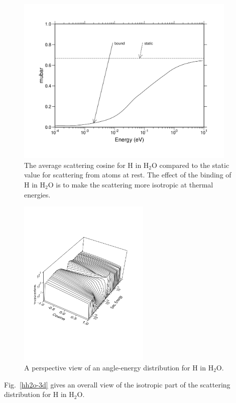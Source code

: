 \begin{figure}[b]\centering
\includegraphics[keepaspectratio, height=3.2in, angle=0]{figs/hh2o-muack}
\caption[The average scattering cosine for H in H$_2$O compared to the
 static value for scattering from atoms at rest]{The average scattering cosine
 for H in H$_2$O compared to the static value for scattering from atoms at
 rest.  The effect of the binding of H in H$_2$O is to make the scattering
 more isotropic at thermal energies.}
\label{hh2o-mu}
\end{figure}

\begin{figure}[p]\centering
\includegraphics[keepaspectratio, height=3.2in, angle=0]{figs/hh2o-aeack}
\caption[A perspective view of an angle-energy distribution for H in H$_2$O.]
  {A perspective view of an angle-energy distribution for H in H$_2$O.}
\label{hh2oael}
\end{figure}

Fig.~\ref{hh2o-3d} gives an overall view of the isotropic part of the
scattering distribution for H in H$_2$O.

